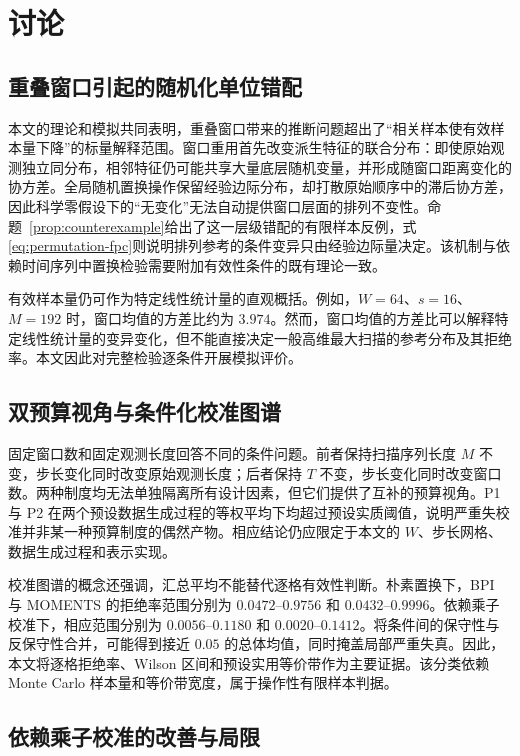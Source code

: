 \section{讨论}\label{sec:discussion}

\subsection{重叠窗口引起的随机化单位错配}\label{sec:disc-validity}

本文的理论和模拟共同表明，重叠窗口带来的推断问题超出了“相关样本使有效样本量下降”的标量解释范围。窗口重用首先改变派生特征的联合分布：即使原始观测独立同分布，相邻特征仍可能共享大量底层随机变量，并形成随窗口距离变化的协方差。全局随机置换操作保留经验边际分布，却打散原始顺序中的滞后协方差，因此科学零假设下的“无变化”无法自动提供窗口层面的排列不变性。命题~\ref{prop:counterexample}给出了这一层级错配的有限样本反例，式\eqref{eq:permutation-fpc}则说明排列参考的条件变异只由经验边际量决定。该机制与依赖时间序列中置换检验需要附加有效性条件的既有理论一致\cite{RomanoTirlea2022}。

有效样本量仍可作为特定线性统计量的直观概括。例如，$W=64$、$s=16$、$M=192$ 时，窗口均值的方差比约为 $3.974$。然而，窗口均值的方差比可以解释特定线性统计量的变异变化，但不能直接决定一般高维最大扫描的参考分布及其拒绝率。本文因此对完整检验逐条件开展模拟评价。

\subsection{双预算视角与条件化校准图谱}\label{sec:disc-surface}

固定窗口数和固定观测长度回答不同的条件问题。前者保持扫描序列长度 $M$ 不变，步长变化同时改变原始观测长度；后者保持 $T$ 不变，步长变化同时改变窗口数。两种制度均无法单独隔离所有设计因素，但它们提供了互补的预算视角。P1 与 P2 在两个预设数据生成过程的等权平均下均超过预设实质阈值，说明严重失校准并非某一种预算制度的偶然产物。相应结论仍应限定于本文的 $W$、步长网格、数据生成过程和表示实现。

校准图谱的概念还强调，汇总平均不能替代逐格有效性判断。朴素置换下，BPI 与 MOMENTS 的拒绝率范围分别为 $0.0472$--$0.9756$ 和 $0.0432$--$0.9996$。依赖乘子校准下，相应范围分别为 $0.0056$--$0.1180$ 和 $0.0020$--$0.1412$。将条件间的保守性与反保守性合并，可能得到接近 $0.05$ 的总体均值，同时掩盖局部严重失真。因此，本文将逐格拒绝率、Wilson 区间和预设实用等价带作为主要证据。该分类依赖 Monte Carlo 样本量和等价带宽度，属于操作性有限样本判据。

\subsection{依赖乘子校准的改善与局限}\label{sec:disc-dmb}

